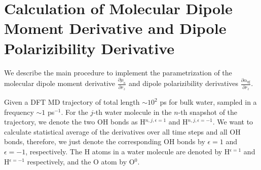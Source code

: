 \section{Calculation of Molecular Dipole Moment Derivative and Dipole Polarizibility Derivative} \label{CHAPETR_A_derivatives} 
We describe the main procedure to implement the parametrization of the molecular dipole moment 
derivative $\frac{\partial \mu_\kappa}{\partial r_z}$ and dipole polarizibility derivatives $\frac{\partial\alpha_{\eta\xi}}{\partial r_z}$. 

Given a DFT MD trajectory of total length $\sim 10^2$ ps for bulk water, sampled in a frequency $\sim 1$ ps$^{-1}$.
For the $j$-th water molecule in the $n$-th snapshot of the trajectory, 
we denote the two OH bonds as H$^{n,j,\epsilon=1}$ and H$^{n,j,\epsilon=-1}$. We want to calculate statistical average of the
derivatives over all time steps and all OH bonds, therefore, 
we just denote the corresponding OH bonds by ${\epsilon=1}$ and ${\epsilon=-1}$, respectively. 
The H atoms in a water molecule are denoted by H$^{\epsilon=1}$ and H$^{\epsilon=-1}$ respectively, and the O atom by O$^{0}$.

